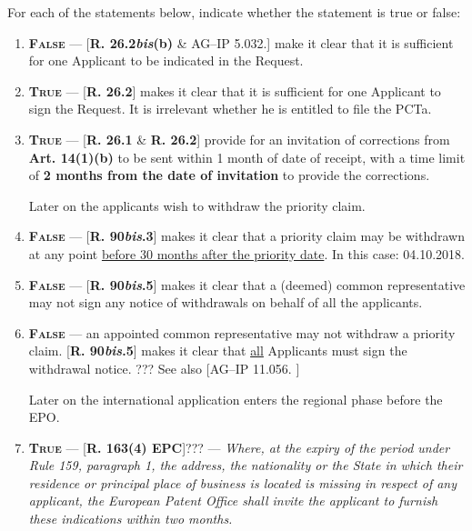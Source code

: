 \documentclass{report}
\begin{document}
\begin{enumerate}[label=\textbf{Answer \arabic*}]
For each of the statements below, indicate whether the statement is true or false:

    \begin{enumerate}[label=(\alph*)]
        \item  \textbf{\textsc{False}} --- [\textbf{R. 26.2\textit{bis}(b)} \& \textsc{AG--IP 5.032.}] make it clear that it is sufficient for one Applicant to be indicated in the Request.
\item \textbf{\textsc{True}} --- [\textbf{R. 26.2}] makes it clear that it is sufficient for one Applicant to sign the Request. It is irrelevant whether he is entitled to file the PCTa.
\item \textbf{\textsc{True}} --- [\textbf{R. 26.1} \& \textbf{R. 26.2}] provide for an invitation of corrections from \textbf{Art. 14(1)(b)} to be sent within 1 month of date of receipt, with a time limit of \textbf{2 months from the date of invitation} to provide the corrections.
\vspace{0.5cm}

Later on the applicants wish to withdraw the priority claim.
 
 \item  \textbf{\textsc{False}} --- [\textbf{R. 90\textit{bis}.3}] makes it clear that a priority claim may be withdrawn at any point \newline \underline{before 30 months after the priority date}. In this case: \textsc{04.10.2018}.
\item \textbf{\textsc{False}} --- [\textbf{R. 90\textit{bis}.5}] makes it clear that a (deemed) common representative may not sign any notice of withdrawals on behalf of all the applicants. 
\item  \textbf{\textsc{False}} --- an appointed common representative may not withdraw a priority claim. [\textbf{R. 90\textit{bis}.5}] makes it clear that \underline{all} Applicants must sign the withdrawal notice. ??? See also [\textsc{AG--IP 11.056.} ]


\vspace{0.5cm}

Later on the international application enters the regional phase before the EPO.


\item \textbf{\textsc{True}} --- [\textbf{R. 163(4) EPC}]??? --- \textit{Where, at the expiry of the period under Rule 159, paragraph 1, the address, the nationality or the State in which their residence or principal place of business is located is missing in respect of any applicant, the European Patent Office shall invite the applicant to furnish these indications within two months.}



\end{enumerate}
\end{enumerate}
\end{document}

